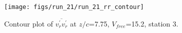 \begin{figure}[H]
\centering
\texttt{[image: figs/run\_21/run\_21\_rr\_contour]}
\caption{Contour plot of $\overline{v_{r}^{\prime} v_{r}^{\prime}}$ at $z/c$=7.75, $V_{free}$=15.2, station 3.}
\label{fig:run_21_rr_contour}
\end{figure}


